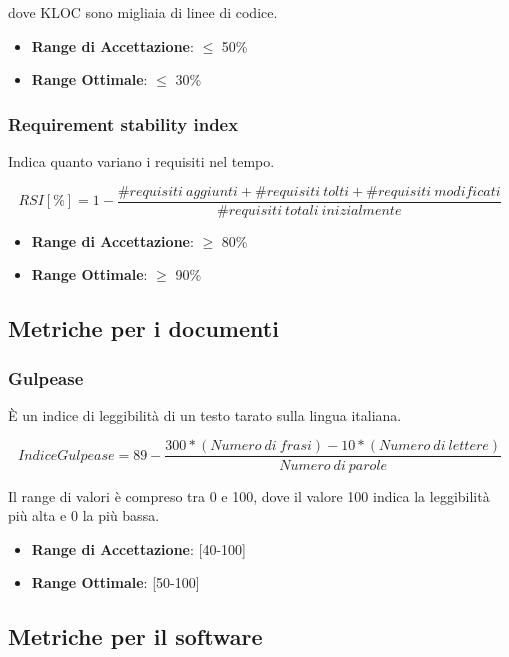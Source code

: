 \documentclass[12pt,a4paper]{article}
\begin{document}
	dove KLOC sono migliaia di linee di codice.
	
	\begin{itemize}
		\item \textbf{Range di Accettazione}: $\leq$ 50\%
		\item \textbf{Range Ottimale}: $\leq$ 30\%
	\end{itemize}
	
	\subsubsection{Requirement stability index}
	Indica quanto variano i requisiti nel tempo.
	
	\[RSI[\%]= 1 - \frac{\#requisiti\ aggiunti+\#requisiti\ tolti+\#requisiti\ modificati}{\#requisiti\ totali\ inizialmente}\]
	
	\begin{itemize}
		\item \textbf{Range di Accettazione}: $\geq$ 80\%
		\item \textbf{Range Ottimale}: $\geq$ 90\%
	\end{itemize}
	
	\subsection{Metriche per i documenti}\label{metriche_doc}
	
	\subsubsection{Gulpease}
	È un indice di leggibilità di un testo tarato sulla lingua italiana.
	
	\[IndiceGulpease=89-\frac{300*(Numero\ di\ frasi)-10*(Numero\ di\ lettere)}{Numero\ di\ parole}\]
	
	Il range di valori è compreso tra 0 e 100, dove il valore 100 indica la leggibilità più alta e 0 la più bassa.
	
	\begin{itemize}
		\item \textbf{Range di Accettazione}: [40-100]
		\item \textbf{Range Ottimale}: [50-100]
	\end{itemize}
	
	\subsection{Metriche per il software}\label{metriche_sw}
	
\end{document}
